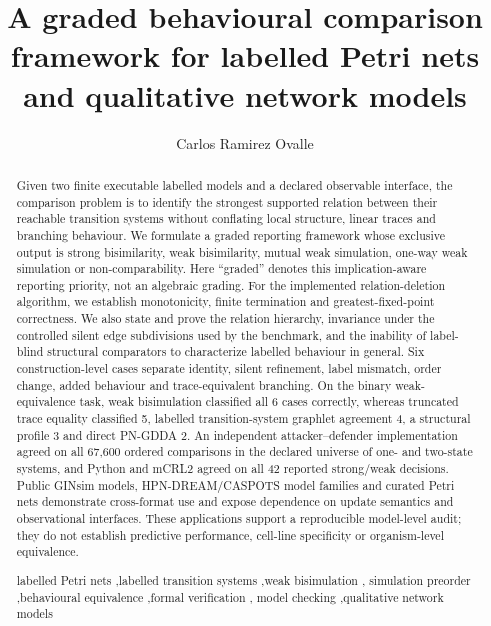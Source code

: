 \documentclass[JMCS,submit]{resources/ISRP}
\theoremstyle{definition}
\theoremstyle{remark}
\numberwithin{equation}{section}
\begin{document}
\title{A graded behavioural comparison framework for labelled Petri nets and
qualitative network models}

\author[a1]{Carlos Ramirez Ovalle}

\address[a1]{Department of Natural Sciences and Mathematics, Pontificia
Universidad Javeriana Cali, Calle 18 No. 118-250, Via a Pance, Cali, Valle del
Cauca, Colombia.}

\begin{abstract}
Given two finite executable labelled models and a declared observable interface,
the comparison problem is to identify the strongest supported relation between
their reachable transition systems without conflating local structure, linear
traces and branching behaviour. We formulate a graded reporting framework whose
exclusive output is strong bisimilarity, weak bisimilarity, mutual weak
simulation, one-way weak simulation or non-comparability. Here ``graded'' denotes
this implication-aware reporting priority, not an algebraic grading. For the
implemented relation-deletion algorithm, we establish monotonicity, finite
termination and greatest-fixed-point correctness. We also state and prove the
relation hierarchy, invariance under the controlled silent edge subdivisions used
by the benchmark, and the inability of label-blind structural comparators to
characterize labelled behaviour in general. Six construction-level cases separate
identity, silent refinement, label mismatch, order change, added behaviour and
trace-equivalent branching. On the binary weak-equivalence task, weak
bisimulation classified all 6 cases correctly, whereas truncated trace equality
classified 5, labelled transition-system graphlet agreement 4, a structural
profile 3 and direct PN-GDDA 2. An independent
attacker--defender implementation agreed on all 67,600 ordered comparisons in the
declared universe of one- and two-state systems, and Python and mCRL2 agreed on all
42 reported strong/weak decisions. Public GINsim models, HPN-DREAM/CASPOTS model
families and curated Petri nets demonstrate cross-format use and expose dependence
on update semantics and observational interfaces. These applications support a
reproducible model-level audit; they do not establish predictive performance,
cell-line specificity or organism-level equivalence.

\begin{keyword}
labelled Petri nets \sep labelled transition systems \sep weak bisimulation \sep
simulation preorder \sep behavioural equivalence \sep formal verification \sep
model checking \sep qualitative network models
\end{keyword}
\end{abstract}
\end{document}
